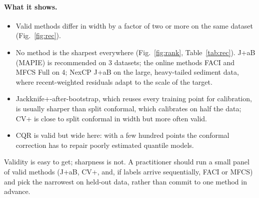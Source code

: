 \documentclass[11pt]{article}
\begin{document}
\paragraph{What it shows.}
\begin{itemize}
\item Valid methods differ in width by a factor of two or more on the same dataset (Fig.~\ref{fig:rec}).
\item No method is the sharpest everywhere (Fig.~\ref{fig:rank}, Table~\ref{tab:rec}). J+aB (MAPIE) is recommended on 3 datasets; the online
methods FACI and MFCS Full on 4; NexCP J+aB on the large, heavy-tailed sediment data, where recent-weighted residuals adapt to the scale of the target.
\item Jackknife+-after-bootstrap, which reuses every training point for calibration, is usually sharper than split conformal, which calibrates on half the data; CV+ is close to split conformal in width but more often valid.
\item CQR is valid but wide here: with a few hundred points the conformal correction has to repair poorly estimated quantile models.
\end{itemize}
\begin{insight}[Takeaway Q3]
Validity is easy to get; sharpness is not. A practitioner should run a small panel of valid methods (J+aB, CV+, and, if labels arrive sequentially,
FACI or MFCS) and pick the narrowest on held-out data, rather than commit to one method in advance.
\end{insight}
\end{document}

